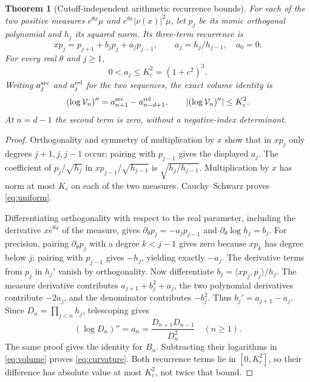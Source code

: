 \documentclass[11pt]{article}
\newtheorem{theorem}{Theorem}[section]
\begin{document}
\begin{theorem}[Cutoff-independent arithmetic recurrence bounds]
For each of the two positive measures $e^{\theta x}\mu$ and
$e^{\theta x}|\nu(x)|^2\mu$, let $p_j$ be its monic orthogonal
polynomial and $h_j$ its squared norm. Its three-term recurrence is
\begin{equation}
 xp_j=p_{j+1}+b_jp_j+a_jp_{j-1},\qquad
 a_j=h_j/h_{j-1},\quad a_0=0.
 \label{eq:recurrence}
\end{equation}
For every real $\theta$ and $j\ge1$,
\begin{equation}
 0<a_j\le K_c^2=(1+c^2)^3.\label{eq:uniform}
\end{equation}
Writing $a_j^{\rm src}$ and $a_j^{\rm rel}$ for the two sequences,
the exact volume identity is
\begin{equation}
 (\log\mathcal V_n)''=a_{n+1}^{\rm src}-a_{n-d+1}^{\rm rel},
 \qquad |(\log\mathcal V_n)''|\le K_c^2.
 \label{eq:curvature}
\end{equation}
At $n=d-1$ the second term is zero, without a negative-index determinant.
\end{theorem}
\begin{proof}
Orthogonality and symmetry of multiplication by $x$ show that in
$xp_j$ only degrees $j+1,j,j-1$ occur; pairing with $p_{j-1}$ gives
the displayed $a_j$. The coefficient of $p_j/\sqrt{h_j}$ in
$x p_{j-1}/\sqrt{h_{j-1}}$ is $\sqrt{h_j/h_{j-1}}$.
Multiplication by $x$ has norm at most $K_c$ on each of the two
measures. Cauchy--Schwarz proves \eqref{eq:uniform}.

Differentiating orthogonality with respect to the real parameter,
including the derivative $x e^{\theta x}$ of the measure, gives
$\partial_\theta p_j=-a_jp_{j-1}$ and
$\partial_\theta\log h_j=b_j$.
For precision, pairing $\partial_\theta p_j$ with a degree $k<j-1$
gives zero because $xp_k$ has degree below $j$; pairing with
$p_{j-1}$ gives $-h_j$, yielding exactly $-a_j$.
The derivative terms from $p_j$ in $h_j'$ vanish by orthogonality.
Now differentiate $b_j=\langle xp_j,p_j\rangle/h_j$.
The measure derivative contributes
$a_{j+1}+b_j^2+a_j$, the two polynomial derivatives contribute
$-2a_j$, and the denominator contributes $-b_j^2$.
Thus $b_j'=a_{j+1}-a_j$. Since $D_n=\prod_{j<n}h_j$,
telescoping gives
\[
 (\log D_n)''=a_n=\frac{D_{n+1}D_{n-1}}{D_n^2}
 \quad(n\ge1).
\]
The same proof gives the identity for $B_n$. Subtracting their
logarithms in \eqref{eq:volume} proves \eqref{eq:curvature}.
Both recurrence terms lie in $[0,K_c^2]$, so their difference has
absolute value at most $K_c^2$, not twice that bound.
\end{proof}
\end{document}
